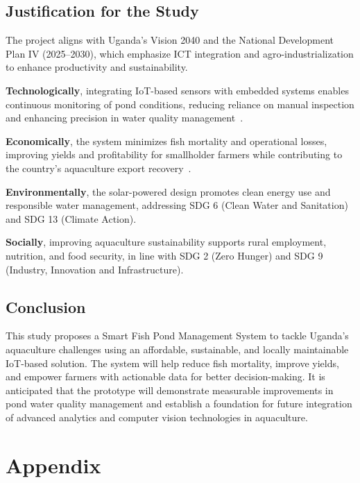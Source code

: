 \documentclass[12pt,a4paper]{report}
\begin{document}
\section{Justification for the Study}
The project aligns with Uganda’s Vision 2040 and the National Development Plan IV (2025–2030), which emphasize ICT integration and agro-industrialization to enhance productivity and sustainability.  

\textbf{Technologically}, integrating IoT-based sensors with embedded systems enables continuous monitoring of pond conditions, reducing reliance on manual inspection and enhancing precision in water quality management~\cite{prapti2022internet}.  

\textbf{Economically}, the system minimizes fish mortality and operational losses, improving yields and profitability for smallholder farmers while contributing to the country’s aquaculture export recovery~\cite{byabasaija2025unlocking}.  

\textbf{Environmentally}, the solar-powered design promotes clean energy use and responsible water management, addressing SDG 6 (Clean Water and Sanitation) and SDG 13 (Climate Action).  

\textbf{Socially}, improving aquaculture sustainability supports rural employment, nutrition, and food security, in line with SDG 2 (Zero Hunger) and SDG 9 (Industry, Innovation and Infrastructure).
 

\section{Conclusion}
This study proposes a Smart Fish Pond Management System to tackle Uganda’s aquaculture challenges using an affordable, sustainable, and locally maintainable IoT-based solution. The system will help reduce fish mortality, improve yields, and empower farmers with actionable data for better decision-making. It is anticipated that the prototype will demonstrate measurable improvements in pond water quality management and establish a foundation for future integration of advanced analytics and computer vision technologies in aquaculture.

\renewcommand{\bibname}{References}



\appendix
\chapter*{Appendix}
\end{document}
